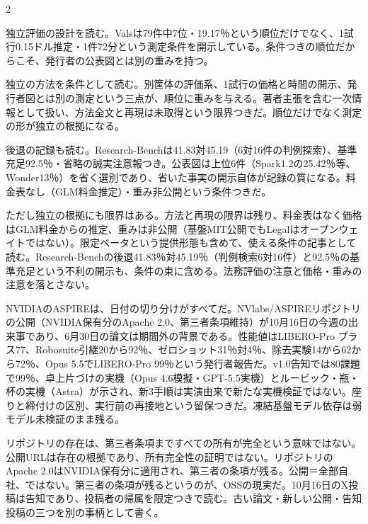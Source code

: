 \documentclass[lualatex,a4paper,10pt]{jlreq}
\begin{document}
\begin{multicols}{2} %


独立評価の設計を読む。Valsは79件中7位・19.17％という順位だけでなく、1試行0.15ドル推定・1件72分という測定条件を開示している。条件つきの順位だからこそ、発行者の公表図とは別の重みを持つ。
\cite{B55,B53,B54}


独立の方法を条件として読む。別筐体の評価系、1試行の価格と時間の開示、発行者図とは別の測定という三点が、順位に重みを与える。著者主張を含む一次情報として扱い、方法全文と再現は未取得という限界つきだ。順位だけでなく測定の形が独立の根拠になる。
\cite{B55,B53,B54}


後退の記録も読む。Research-Benchは41.83対45.19（6対16件の判例探索）、基準充足92.5％・省略の誠実注意報つき。公表図は上位6件（Spark1.2の25.42％等、Wonder13％）を省く選別であり、省いた事実の開示自体が記録の質になる。料金表なし（GLM料金推定）・重み非公開という条件つきだ。
\cite{B55,B53,B54}


ただし独立の根拠にも限界はある。方法と再現の限界は残り、料金表はなく価格はGLM料金からの推定、重みは非公開（基盤MIT公開でもLegalはオープンウェイトではない）。限定ベータという提供形態も含めて、使える条件の記事として読む。Research-Benchの後退41.83％対45.19％（判例検索6対16件）と92.5％の基準充足という不利の開示も、条件の束に含める。法務評価の注意と価格・重みの注意を落とさない。
\cite{B55,B53,B54}


NVIDIAのASPIREは、日付の切り分けがすべてだ。NVlabs/ASPIREリポジトリの公開（NVIDIA保有分のApache 2.0、第三者条項維持）が10月16日の今週の出来事であり、6月30日の論文は期間外の背景である。性能値はLIBERO-Pro プラス77、Robosuite引継20から92％、ゼロショット31％対4％、除去実験14から62から72％、Opus 5.5でLIBERO-Pro 99％という発行者報告だ。v1.0告知では80課題で99％、卓上片づけの実機（Opus 4.6模擬・GPT-5.5実機）とルービック・瓶・杯の実機（Astra）が示され、新3手順は実演由来で新たな実機検証ではない。座りと締付けの区別、実行前の再接地という留保つきだ。凍結基盤モデル依存は弱モデル未検証のまま残る。
\cite{B57,B56,B89}


リポジトリの存在は、第三者条項まですべての所有が完全という意味ではない。公開URLは存在の根拠であり、所有完全性の証明ではない。リポジトリのApache 2.0はNVIDIA保有分に適用され、第三者の条項が残る。公開＝全部自社、ではない。第三者の条項が残るというのが、OSSの現実だ。10月16日のX投稿は告知であり、投稿者の帰属を限定つきで読む。古い論文・新しい公開・告知投稿の三つを別の事柄として書く。
\cite{B57,B56}



\end{multicols}
\end{document}
